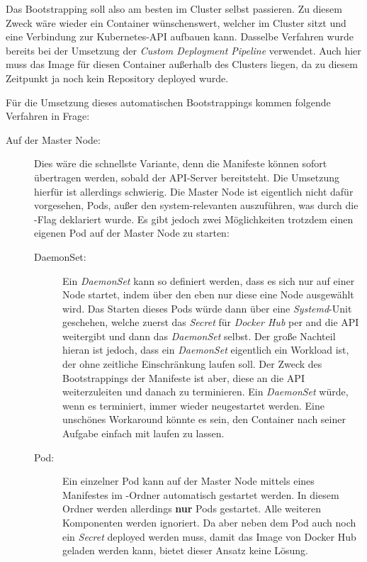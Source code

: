 Das Bootstrapping soll also am besten im Cluster selbst passieren. Zu
diesem Zweck wäre wieder ein Container wünschenswert, welcher im Cluster
sitzt und eine Verbindung zur Kubernetes-API aufbauen kann. Dasselbe Verfahren
wurde bereits bei der Umsetzung der \emph{Custom Deployment Pipeline} verwendet.
Auch hier muss das Image für diesen Container außerhalb des Clusters liegen,
da zu diesem Zeitpunkt ja noch kein Repository deployed wurde.

Für die Umsetzung dieses automatischen Bootstrappings kommen folgende
Verfahren in Frage:
\begin{description}
  \item[Auf der Master Node: ] Dies wäre die schnellste Variante, denn
  die Manifeste können sofort übertragen werden, sobald der API-Server
  bereitsteht. Die Umsetzung hierfür ist allerdings schwierig.
  Die Master Node ist eigentlich nicht dafür vorgesehen, Pods, außer den
  system-relevanten auszuführen, was durch die -Flag
  deklariert wurde.
  Es gibt jedoch zwei Möglichkeiten trotzdem einen eigenen Pod auf der Master
  Node zu starten:
  \begin{description}
    \item[DaemonSet:] Ein \emph{DaemonSet} kann so definiert werden, dass es sich nur
    auf einer Node startet, indem über den  eben nur diese
    eine Node ausgewählt wird. Das Starten dieses Pods würde dann über
    eine \emph{Systemd}-Unit geschehen, welche zuerst das \emph{Secret} für
    \emph{Docker Hub} per  and die API weitergibt und dann das
    \emph{DaemonSet} selbst.
    Der große Nachteil hieran ist jedoch, dass ein \emph{DaemonSet} eigentlich ein
    Workload ist, der ohne zeitliche Einschränkung laufen soll. Der Zweck des
    Bootstrappings der Manifeste ist aber, diese an die API weiterzuleiten und
    danach zu terminieren. Ein \emph{DaemonSet} würde, wenn es terminiert, immer wieder
    neugestartet werden. Eine unschönes Workaround könnte es sein,
    den Container nach
    seiner Aufgabe einfach mit  laufen zu lassen.
    \item[Pod:]
    Ein einzelner Pod kann auf der Master Node mittels eines Manifestes im
    -Ordner automatisch gestartet werden. In
    diesem Ordner werden allerdings \textbf{nur} Pods gestartet. Alle weiteren
    Komponenten werden ignoriert.
    Da aber neben dem Pod auch noch ein \emph{Secret} deployed werden muss, damit
    das Image von Docker Hub geladen werden kann, bietet dieser Ansatz keine
    Lösung.
  \end{description}


\end{description}
